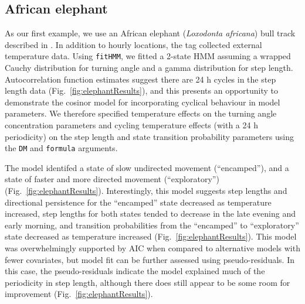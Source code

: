 \documentclass[12pt]{article}\usepackage[]{graphicx}\usepackage[]{color}
\begin{document}
\subsection{African elephant}
\label{sec:elephant}
As our first example, we use an African elephant ({\it Loxodonta africana}) bull track described in \cite{WallEtAl2014}%
. In addition to hourly locations, the tag collected external temperature data. %
Using \verb|fitHMM|, we fitted a 2-state HMM assuming a wrapped Cauchy distribution for turning angle and a gamma distribution for step length. Autocorrelation function estimates suggest there are 24 h cycles in the step length data (Fig.\ \ref{fig:elephantResults}), and this presents an opportunity to demonstrate the cosinor model for incorporating cyclical behaviour in model parameters. We therefore specified temperature effects on the turning angle concentration parameters and cycling temperature effects (with a 24 h periodicity) on the step length and state transition probability parameters using the \verb|DM| and \verb|formula| arguments. 

The model identifed a state of slow undirected movement (``encamped''), and a state of faster and more directed movement (``exploratory'') (Fig.\ \ref{fig:elephantResults}). %
Interestingly, this model suggests step lengths and directional persistence for the ``encamped'' state decreased as temperature increased, step lengths for both states tended to decrease in the late evening and early morning, and transition probabilities from the ``encamped'' to ``exploratory'' state decreased as temperature increased (Fig.\ \ref{fig:elephantResults}). This model was overwhelmingly supported by AIC when compared to alternative models with fewer covariates, but model fit can be further assessed using pseudo-residuals.  In this case, the pseudo-residuals indicate the model explained much of the periodicity in step length, although there does still appear to be some room for improvement (Fig.\ \ref{fig:elephantResults}).
\end{document}
